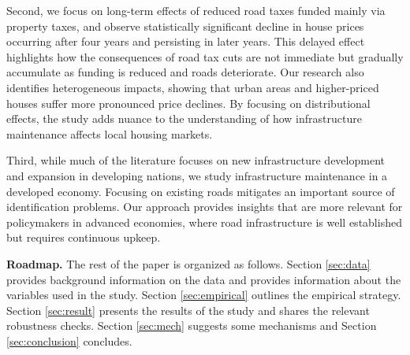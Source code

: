 Second, we focus on long-term effects of reduced road taxes funded mainly via property taxes, and observe statistically significant decline in house prices occurring after four years and persisting in later years. This delayed effect highlights how the consequences of road tax cuts are not immediate but gradually accumulate as funding is reduced and roads deteriorate. Our research also identifies heterogeneous impacts, showing that urban areas and higher-priced houses suffer more pronounced price declines. By focusing on distributional effects, the study adds nuance to the understanding of how infrastructure maintenance affects local housing markets.

Third, while much of the literature focuses on new infrastructure development and expansion in developing nations, we study infrastructure maintenance in a developed economy.  Focusing on existing roads mitigates an important source of identification problems. Our approach provides insights that are more relevant for policymakers in advanced economies, where road infrastructure is well established but requires continuous upkeep. 

{\bf Roadmap.} The rest of the paper is organized as follows. Section \ref{sec:data} provides background information on the data and provides information about the variables used in the study. Section \ref{sec:empirical} outlines the empirical strategy. Section \ref{sec:result} presents the results of the study and shares the relevant robustness checks. Section \ref{sec:mech} suggests some mechanisms and Section \ref{sec:conclusion} concludes. 